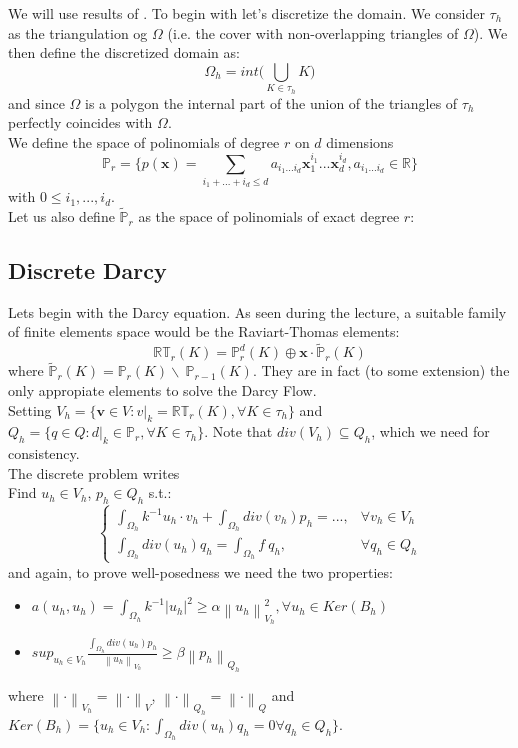 \documentclass[conference]{IEEEtran}
\newcommand{\norm}[1]{\left\lVert#1\right\rVert}
\begin{document}
We will use results of \cite{Perotto}. To begin with let's discretize the domain. We consider $\tau_h$ as the triangulation og $\Omega$ (i.e. the cover with non-overlapping triangles of $\Omega$). We then define the discretized domain as:
\begin{equation}
	\Omega_h = int \bigg(\bigcup_{K\in \tau_h} K \bigg)
\end{equation}
and since $\Omega$ is a polygon the internal part of the union of the triangles of $\tau_h$ perfectly coincides with $\Omega$.\\

We define the space of polinomials of degree $r$ on $d$ dimensions
$$\mathbb{P}_r= \{p(\textbf{x}) = \sum\limits_{i_1+...+i_d \leq d} a_{i_1...i_d}\textbf{x}_1^{i_1}...\textbf{x}_d^{i_d}, a_{i_1...i_d} \in  \mathbb{R}\}$$
with $0 \leq i_1,...,i_d $.\\
Let us also define $\tilde{\mathbb{P}}_r$ as the space of polinomials of exact degree $r$: 
 

\subsection{Discrete Darcy}
Lets begin with the Darcy equation. As seen during the lecture, a suitable family of finite elements space would be the Raviart-Thomas elements: 
\begin{equation}
	\mathbb{RT}_r (K) = \mathbb{P}_r^d(K) \oplus \textbf{x}\cdot \tilde{\mathbb{P}}_r(K)
\end{equation} 
where $ \tilde{\mathbb{P}}_r(K) = \mathbb{P}_r(K) \backslash \ \mathbb{P}_{r-1}(K) $. They are in fact (to some extension) the only appropiate elements to solve the Darcy Flow.\\
Setting $V_h=\{ \textbf{v} \in V : v|_k = \mathbb{RT}_r(K) , \forall K \in \tau_h \}$ and $Q_h= \{ q \in Q : d|_k \in  \mathbb{P}_r, \forall K \in \tau_h\}$. Note that $div(V_h) \subseteq Q_h$, which we need for consistency.\\
The discrete problem writes\\
Find $u_h \in V_h$, $p_h \in Q_h$ s.t.:
\begin{equation}
	\begin{cases}
		\int_{\Omega_h} k^{-1} u_h \cdot v_h + \int_{\Omega_h} div(v_h) p_h = ... ,&\forall v_h \in V_h \\
		\int_{\Omega_h} div(u_h) q_h = \int_{\Omega_h} f\ q_h, &\forall q_h \in Q_h
	\end{cases}
	\label{eq:DDarcy}
\end{equation}
and again, to prove well-posedness we need the two properties:
\begin{itemize}
\item $a(u_h,u_h)=\int_{\Omega_h} k^{-1} |u_h|^2 \geq \alpha \norm{u_h}^2_{V_h} , \forall u_h \in Ker(B_h)$
\item $sup_{u_h \in V_h} \frac{\int_{\Omega_h} div(u_h) p_h}{\norm{u_h}_{V_h}} \geq \beta \norm{p_h}_{Q_h}$
\end{itemize}
where $\norm{\cdot}_{V_h} = \norm{\cdot}_{V} $, $\norm{\cdot}_{Q_h} = \norm{\cdot}_{Q} $ and $Ker(B_h)=\{u_h \in V_h : \int_{\Omega_h} div(u_h) q_h = 0 \forall q_h \in Q_h \}$.\\
\end{document}
